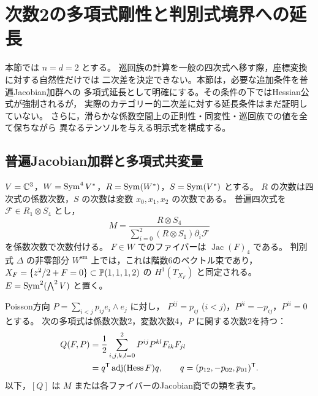 \section{次数2の多項式剛性と判別式境界への延長}
\label{sec:kuznetsov-hessian-rigidity}

本節では $n=d=2$ とする。
巡回族の計算を一般の四次式へ移す際，座標変換に対する自然性だけでは
二次差を決定できない。本節は，必要な追加条件を普遍Jacobian加群への
多項式延長として明確にする。その条件の下ではHessian公式が強制されるが，
実際のカテゴリー的二次差に対する延長条件はまだ証明していない。
さらに，滑らかな係数空間上の正則性・同変性・巡回族での値を全て保ちながら
異なるテンソルを与える明示式を構成する。

\subsection{普遍Jacobian加群と多項式共変量}

$V=\mathbb C^3$，$W=\operatorname{Sym}^4V^*$，$R=\operatorname{Sym}(W^*)$，$S=\operatorname{Sym}(V^*)$ とする。
$R$ の次数は四次式の係数次数，$S$ の次数は変数 $x_0,x_1,x_2$ の次数である。
普遍四次式を $\mathcal F\in R_1\otimes S_4$ とし，
\begin{equation}\label{eq:ku-universal-quartic-jacobian-module}
 M=\frac{R\otimes S_4}
 {\displaystyle\sum_{i=0}^2(R\otimes S_1)\partial_i\mathcal F}
\end{equation}
を係数次数で次数付ける。
$F\in W$ でのファイバーは $\operatorname{Jac}(F)_4$ である。
判別式 $\Delta$ の非零部分 $W^{\mathrm{sm}}$ 上では，これは階数6のベクトル束であり，
$X_F=\{z^2/2+F=0\}\subset\mathbb P(1,1,1,2)$ の $H^1(T_{X_F})$ と同定される。
$E=\operatorname{Sym}^2(\bigwedge^2V)$ と置く。

Poisson方向 $P=\sum_{i<j}p_{ij}e_i\wedge e_j$ に対し，
$P^{ij}=p_{ij}$ ($i<j$)，$P^{ji}=-p_{ij}$，$P^{ii}=0$ とする。
次の多項式は係数次数2，変数次数4，$P$ に関する次数2を持つ：
\begin{align}
 Q(F,P)
 &=\frac12\sum_{i,j,k,l=0}^2
       P^{ij}P^{kl}F_{ik}F_{jl}\label{eq:ku-hessian-universal-contraction}\\
 &=q^{\mathsf T}\operatorname{adj}(\operatorname{Hess}F)q,
 \qquad q=(p_{12},-p_{02},p_{01})^{\mathsf T}.\notag
\end{align}
以下，$[Q]$ は $M$ または各ファイバーのJacobian商での類を表す。

